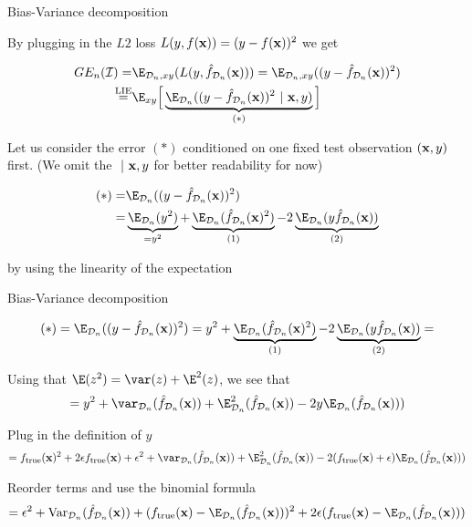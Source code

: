 \documentclass[11pt,compress,t,notes=noshow, xcolor=table]{beamer}
\begin{document}
\begin{frame2}[small]{Bias-Variance decomposition}

By plugging in the $L2$ loss $L(y, f(\mathbf{x})) = (y - f(\mathbf{x}))^2$ we get

\begin{align*}
GE_n(\ind) =& \E_{\D_n, xy}( L(y, \fh_{\D_n}(\xv))) = \E_{\D_n, xy}((y - \fh_{\D_n}(\xv))^2) \\
\stackrel{\text{LIE}}{=}& \E_{xy}\Big[\underbrace{\E_{\D_n}((y - \fh_{\D_n}(\xv))^2~|~ \xv, y)}_{(*)}\Big] 
\end{align*}

Let us consider the error $(*)$ conditioned on one fixed test observation $(\mathbf{x}, y)$ first. (We omit the $~|~\mathbf{x}, y$ for better readability for now)

\begin{align*}
(*) =& \E_{\D_n}((y - \fh_{\D_n}(\xv))^2)\\
=& \underbrace{\E_{\D_n}(y^2)}_{= y^2} + \underbrace{\E_{\D_n}(\fh_{\D_n}(\xv)^2)}_{(1)}  - 2\underbrace{\E_{\D_n}(y\fh_{\D_n}(\xv))}_{(2)} 
\end{align*}

by using the linearity of the expectation  %

\end{frame2}

\begin{frame2}[footnotesize]{Bias-Variance decomposition}

$$
(*) = \E_{\D_n}((y - \fh_{\D_n}(\xv))^2) = 
y^2 + \underbrace{\E_{\D_n}(\fh_{\D_n}(\xv)^2)}_{(1)}  - 2\underbrace{\E_{\D_n}(y\fh_{\D_n}(\xv))}_{(2)} =
$$

\vfill

Using that $\E(z^2) =\var(z) + \E^2(z)$, we see that
$$
= y^2 + \var_{\D_n}(\fh_{\D_n}(\xv)) + \E^2_{\D_n}(\fh_{\D_n}(\xv)) - 2y \E_{\D_n}(\fh_{\D_n}(\xv))) 
$$

\vfill

Plug in the definition of $y$
$$
= \ftrue(\xv)^2 +2\epsilon\ftrue(\xv) + \epsilon^2 + \var_{\D_n}(\fh_{\D_n}(\xv)) + \E^2_{\D_n}(\fh_{\D_n}(\xv)) - 2 (\ftrue(\xv)+\epsilon)\E_{\D_n}(\fh_{\D_n}(\xv))) 
$$

\vfill

Reorder terms and use the binomial formula
$$
= \epsilon^2 + \text{Var}_{\D_n}(\fh_{\D_n}(\xv)) + 
(\ftrue(\xv) - \E_{\D_n}(\fh_{\D_n}(\xv)))^2
+2 \epsilon (\ftrue(\xv) - \E_{\D_n}(\fh_{\D_n}(\xv)))
$$

\end{frame2}
\end{document}

